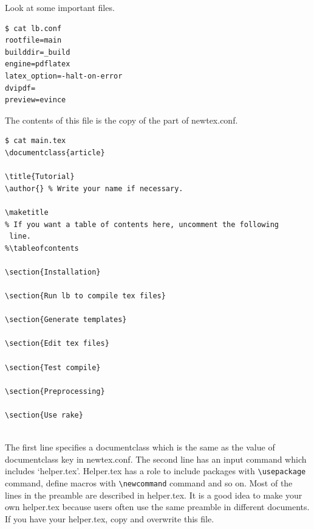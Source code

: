 Look at some important files.
\begin{verbatim}
$ cat lb.conf
rootfile=main
builddir=_build
engine=pdflatex
latex_option=-halt-on-error
dvipdf=
preview=evince
\end{verbatim}
The contents of this file is the copy of the part of newtex.conf.
\begin{verbatim}
$ cat main.tex
\documentclass{article}

\title{Tutorial}
\author{} % Write your name if necessary.

\maketitle
% If you want a table of contents here, uncomment the following
 line.
%\tableofcontents

\section{Installation}
  
\section{Run lb to compile tex files}
  
\section{Generate templates}
  
\section{Edit tex files}
  
\section{Test compile}
  
\section{Preprocessing}
  
\section{Use rake}
  

\end{verbatim}
The first line specifies a documentclass which is the same as the value of documentclass key in newtex.conf.
The second line has an input command which includes `helper.tex'.
Helper.tex has a role to include packages with \verb|\usepackage| command, define macros with \verb|\newcommand| command and so on.
Most of the lines in the preamble are described in helper.tex.
It is a good idea to make your own helper.tex because users often use the same preamble in different documents.
If you have your helper.tex, copy and overwrite this file.

